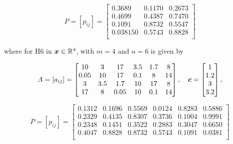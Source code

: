 $$
P=[p_{ij}] = \begin{bmatrix}
0.3689 & 0.1170 & 0.2673 \\
0.4699 & 0.4387 & 0.7470 \\
0.1091 & 0.8732 & 0.5547 \\
0.038150 & 0.5743 & 0.8828 \\
\end{bmatrix}
$$

where for H6 in $\boldsymbol{x}\in\mathbb{R}^4$, with $m=4$ and $n=6$ is given by

$$
A=[a_{ij}] = \begin{bmatrix}
10 & 3 & 17 & 3.5 & 1.7 & 8\\
0.05 & 10 & 17 & 0.1 & 8 & 14  \\
3 & 3.5 & 1.7 & 10 & 17 & 8 \\
17 & 8 & 0.05 & 10 & 0.1 & 14 
\end{bmatrix},
\quad
\boldsymbol{c} = \begin{bmatrix} 1 \\ 1.2 \\ 3 \\ 3.2 \end{bmatrix},
$$

$$
P=[p_{ij}] = \begin{bmatrix}
0.1312 & 0.1696 & 0.5569 & 0.0124 & 0.8283 & 0.5886 \\
0.2329 & 0.4135 & 0.8307 & 0.3736 & 0.1004 & 0.9991 \\
0.2348 & 0.1451 & 0.3522 & 0.2883 & 0.3047 & 0.6650\\
0.4047 & 0.8828 & 0.8732 & 0.5743 & 0.1091 & 0.0381 \\
\end{bmatrix}
$$



